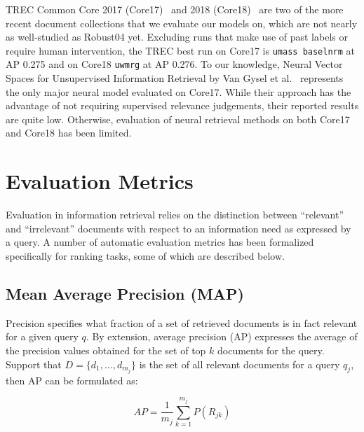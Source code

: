 TREC Common Core 2017 (Core17)~\cite{allan2017trec} and 2018 (Core18)~\cite{core2018trec} are two of the more recent document collections that we evaluate our models on, which are not nearly as well-studied as Robust04 yet.
Excluding runs that make use of past labels or require human intervention, the TREC best run on Core17 is \texttt{umass baselnrm} at AP 0.275 and on Core18 \texttt{uwmrg} at AP 0.276.
To our knowledge, Neural Vector Spaces for Unsupervised Information Retrieval by Van Gysel et al.~\cite{Gysel:2018:NVS:3211967.3196826} represents the only major neural model evaluated on Core17.
While their approach has the advantage of not requiring supervised relevance judgements, their reported results are quite low.
Otherwise, evaluation of neural retrieval methods on both Core17 and Core18 has been limited.

\section{Evaluation Metrics}

Evaluation in information retrieval relies on the distinction between ``relevant'' and ``irrelevant'' documents with respect to an information need as expressed by a query.
A number of automatic evaluation metrics has been formalized specifically for ranking tasks, some of which are described below.


\subsection{Mean Average Precision (MAP)}

Precision specifies what fraction of a set of retrieved documents is in fact relevant for a given query $ q $.
By extension, average precision (AP) expresses the average of the precision values obtained for the set of top $ k $ documents for the query.
Support that $ D = \{d_1, ..., d_{m_j}\} $ is the set of all relevant documents for a query $ q_j $, then AP can be formulated as:

\begin{equation}
AP = \frac{1}{m_j} \sum^{m_j} _{k = 1} P(R_{jk})
\end{equation}

